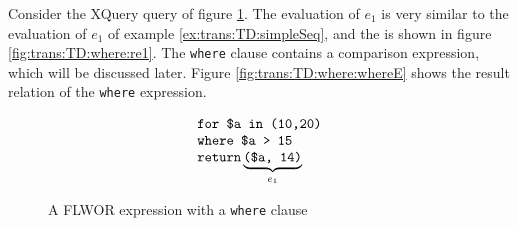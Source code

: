 \begin{myExample}
Consider the XQuery query of figure \ref{fig:trans:TD:whereQuery}. The evaluation of $e_{1}$ is very similar to
the evaluation of $e_{1}$ of example \ref{ex:trans:TD:simpleSeq}, and the is shown in figure
\ref{fig:trans:TD:where:re1}. The \texttt{where} clause contains a comparison expression, which will be discussed
later. Figure \ref{fig:trans:TD:where:whereE} shows the result relation of the \texttt{where} expression.

\begin{figure}[h]
\centering
\begin{equation*}
\begin{array}{l}
\mbox{\texttt{for \$a in (10,20)}} \\
\mbox{\texttt{where \$a > 15}} \\
\mbox{\texttt{return}} \underbrace{\mbox{\texttt{(\$a, 14)}}}_{e_{1}}
\end{array}
\end{equation*}
\caption{A FLWOR expression with a \texttt{where} clause \label{fig:trans:TD:whereQuery}}
\end{figure}

\begin{figure}[h]
\centering
{}
\qquad
{}
\qquad
{}


\end{figure}
\end{myExample}
